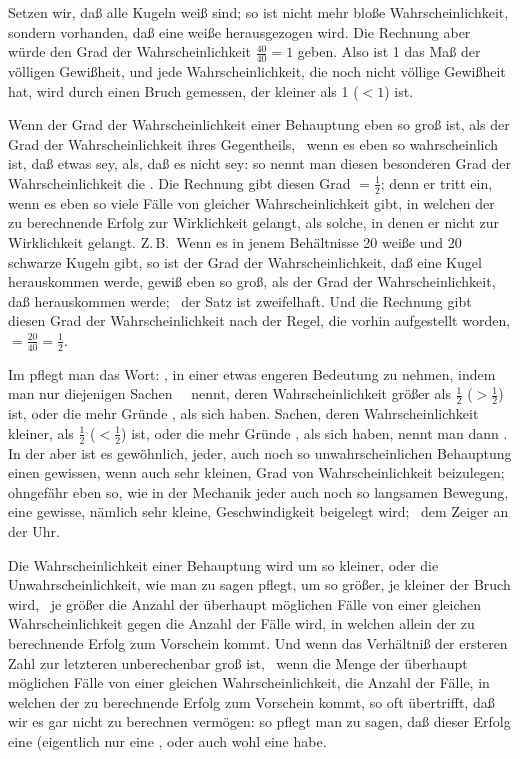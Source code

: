 \begin{aufza}
\item Setzen wir, daß alle Kugeln weiß sind; so ist nicht mehr bloße Wahrscheinlichkeit, sondern  vorhanden, daß eine weiße herausgezogen wird. Die Rechnung aber würde den Grad der Wahrscheinlichkeit $\frac{40}{40} = 1$ geben. Also ist 1 das Maß der völligen Gewißheit, und jede Wahrscheinlichkeit, die noch nicht völlige Gewißheit hat, wird durch einen Bruch gemessen, der kleiner als 1 ($< 1$) ist.
\item Wenn der Grad der Wahrscheinlichkeit einer Behauptung eben so groß ist, als der Grad der Wahrscheinlichkeit ihres  Gegentheils, \dh\ wenn es eben so wahrscheinlich ist, daß etwas sey, als, daß es nicht sey: so nennt man diesen besonderen Grad der Wahrscheinlichkeit die . Die Rechnung gibt diesen Grad $= \frac{1}{2}$; denn er tritt ein, wenn es eben so viele Fälle von gleicher Wahrscheinlichkeit gibt, in welchen der zu berechnende Erfolg zur Wirklichkeit gelangt, als solche, in denen er nicht zur Wirklichkeit gelangt. Z.\,B.\ Wenn es in jenem Behältnisse 20 weiße und 20 schwarze Kugeln gibt, so ist der Grad der Wahrscheinlichkeit, daß eine  Kugel herauskommen werde, gewiß eben so groß, als der Grad der Wahrscheinlichkeit, daß  herauskommen werde; \dh\ der Satz ist zweifelhaft. Und die Rechnung gibt diesen Grad der Wahrscheinlichkeit nach der Regel, die vorhin aufgestellt worden, $= \frac{20}{40} = \frac{1}{2}$.
\item Im  pflegt man das Wort: , in einer etwas engeren Bedeutung zu nehmen, indem man nur diejenigen Sachen ~\ nennt, deren Wahrscheinlichkeit größer als $\frac{1}{2}$ ($> \frac{1}{2}$) ist, oder die mehr Gründe , als  sich haben. Sachen, deren Wahrscheinlichkeit kleiner, als $\frac{1}{2}$ ($< \frac{1}{2}$) ist, oder die mehr Gründe , als  sich haben, nennt man dann . In der  aber ist es gewöhnlich, jeder, auch noch so unwahrscheinlichen Behauptung einen gewissen, wenn auch sehr kleinen, Grad von Wahrscheinlichkeit beizulegen; ohngefähr eben so, wie in der Mechanik jeder auch noch so langsamen Bewegung, eine gewisse, nämlich sehr kleine, Geschwindigkeit beigelegt wird; \zB\ dem Zeiger an der Uhr.
\item Die Wahrscheinlichkeit einer Behauptung wird um so kleiner, oder die Unwahrscheinlichkeit, wie man zu sagen pflegt, um so größer, je kleiner der Bruch wird, \dh\ je größer die Anzahl der überhaupt möglichen Fälle von einer gleichen Wahrscheinlichkeit gegen die Anzahl der Fälle wird, in welchen allein der zu berechnende Erfolg zum Vorschein kommt. Und wenn das Verhältniß der ersteren Zahl zur letzteren unberechenbar groß ist, \dh\ wenn die Menge der überhaupt möglichen Fälle von einer gleichen Wahrscheinlichkeit, die Anzahl der Fälle, in welchen der zu berechnende Erfolg zum Vorschein kommt, so oft übertrifft, daß wir es gar nicht zu berechnen vermögen: so pflegt man zu sagen, daß dieser Erfolg eine  (eigentlich nur eine , oder auch wohl eine  habe.

\end{aufza}
